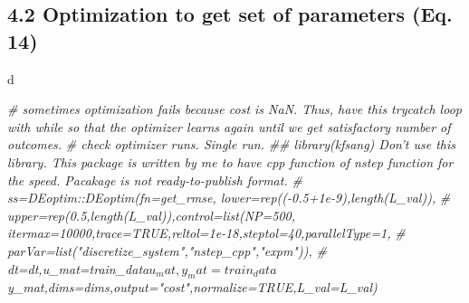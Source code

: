 \documentclass[
]{article}
\newenvironment{Shaded}{\begin{snugshade}}{\end{snugshade}}
\newcommand{\CommentTok}[1]{\textcolor[rgb]{0.56,0.35,0.01}{\textit{#1}}}
\begin{document}
\hypertarget{optimization-to-get-set-of-parameters-eq.-14}{%
\subsection{4.2 Optimization to get set of parameters (Eq.
14)}\label{optimization-to-get-set-of-parameters-eq.-14}}

d

\begin{Shaded}
\begin{Highlighting}[]
\CommentTok{# sometimes optimization fails because cost is NaN. Thus, have this trycatch loop with while so that the optimizer learns again until we get satisfactory number of outcomes.}
\CommentTok{# check optimizer runs. Single run.}
\CommentTok{## library(kfsang) Don't use this library. This package is written by me to have cpp function of nstep function for the speed. Pacakage is not ready-to-publish format.}
\CommentTok{# ss=DEoptim::DEoptim(fn=get_rmse, lower=rep((-0.5+1e-9),length(L_val)),}
\CommentTok{#                      upper=rep(0.5,length(L_val)),control=list(NP=500, itermax=10000,trace=TRUE,reltol=1e-18,steptol=40,parallelType=1,}
\CommentTok{#                                                   parVar=list("discretize_system","nstep_cpp","expm")),}
\CommentTok{#                      dt=dt,u_mat=train_data$u_mat,y_mat=train_data$y_mat,dims=dims,output="cost",normalize=TRUE,L_val=L_val)}


\end{Highlighting}
\end{Shaded}
\end{document}
